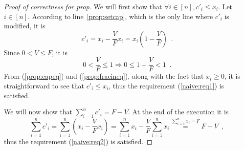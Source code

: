 \begin{proof}[Proof of correctness for prop]
  We will first show that $\forall i \in [n], c'_i \leq x_i$. Let $i \in [n]$. According to line~\ref{prop:setcap}, which
  is the only line where $c'_i$ is modified, it is
  \begin{equation}
  \label{prop:capeq}
    c'_i = x_i - \frac{V}{F}x_i = x_i\left(1 - \frac{V}{F}\right) \enspace.
  \end{equation}
  Since $0 < V \leq F$, it is
  \begin{equation}
  \label{prop:fracineq}
    0 < \frac{V}{F} \leq 1 \Rightarrow 0 \leq 1 - \frac{V}{F} < 1 \enspace.
  \end{equation}
  From (\ref{prop:capeq}) and (\ref{prop:fracineq}), along with the fact that $x_i \geq 0$, it is straightforward to see that
  $c'_i \leq x_i$, thus the requirement (\ref{naive:req1}) is satisfied.

  We will now show that $\sum\limits_{i=1}^nc'_i = F - V$. At the end of the execution it is
  \begin{equation*}
    \sum\limits_{i=1}^nc'_i = \sum\limits_{i=1}^n\left(x_i - \frac{V}{F}x_i\right) =
    \sum\limits_{i=1}^nx_i - \frac{V}{F}\sum\limits_{i=1}^nx_i \overset{\sum\limits_{i=1}^nx_i = F}{=} F - V \enspace,
  \end{equation*}
  thus the requirement (\ref{naive:req2}) is satisfied.
\end{proof}
